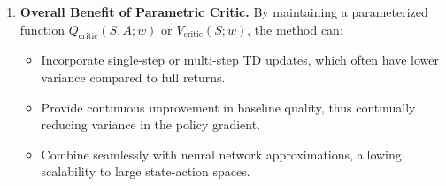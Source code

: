 \begin{enumerate}
    \item \textbf{Overall Benefit of Parametric Critic.}
    By maintaining a parameterized function \(Q_{\text{critic}}(S,A; w)\) or \(V_{\text{critic}}(S; w)\), the method can:
    \begin{itemize}
        \item Incorporate single-step or multi-step TD updates, which often have lower variance compared to full returns.
        \item Provide continuous improvement in baseline quality, thus continually reducing variance in the policy gradient.
        \item Combine seamlessly with neural network approximations, allowing scalability to large state-action spaces.
    \end{itemize}
\end{enumerate}
